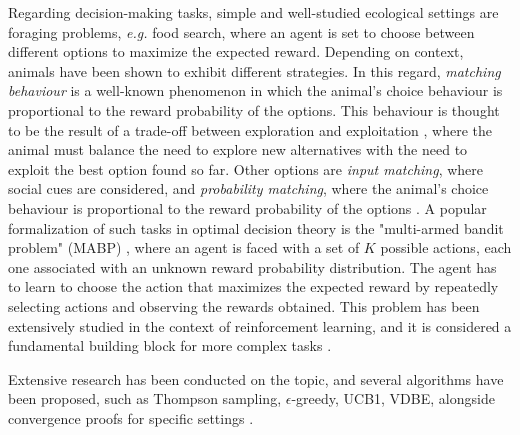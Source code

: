 Regarding decision-making tasks, simple and well-studied ecological settings are foraging problems, \textit{e.g.} food search, where an agent is set to choose between different options to maximize the expected reward.
Depending on context, animals have been shown to exhibit different strategies.
In this regard, \textit{matching behaviour} is a well-known phenomenon in which the animal's choice behaviour is proportional to the reward probability of the options.
This behaviour is thought to be the result of a trade-off between exploration and exploitation \cite{suttonReinforcementLearningProblem1998, nivEvolutionReinforcementLearning2002}, where the animal must balance the need to explore new alternatives with the need to exploit the best option found so far.
Other options are \textit{input matching}, where social cues are considered, and \textit{probability matching}, where the animal's choice behaviour is proportional to the reward probability of the options
\cite{bariDynamicDecisionMaking2021, houstonMatchingBehavioursRewards2021}. A popular formalization of such tasks in optimal decision theory is the "multi-armed bandit problem" (MABP) \cite{averbeckTheoryChoiceBandit2015}, where an agent is faced with a set of $K$ possible actions, each one associated with an unknown reward probability distribution.
The agent has to learn to choose the action that maximizes the expected reward by repeatedly selecting actions and observing the rewards obtained.
This problem has been extensively studied in the context of reinforcement learning, and it is considered a fundamental building block for more complex tasks \cite{suttonReinforcementLearningProblem1998}.


Extensive research has been conducted on the topic, and several algorithms have been proposed, such as Thompson sampling, $\epsilon$-greedy, UCB1, VDBE, alongside convergence proofs for specific settings \cite{gittinsBanditProcessesDynamic1979, kaufmannThompsonSamplingAsymptotically2012, banMultifacetContextualBandits2021, tokicAdaptiveEGreedyExploration2010, tokicValueDifferenceBasedExploration2011}.

